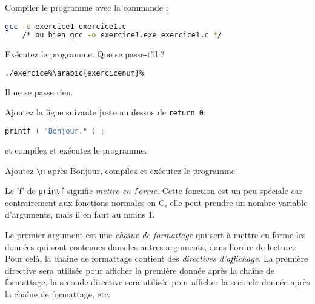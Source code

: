 \question Compiler le programme avec la commande :
\begin{solutioncachee}
  \begin{lstlisting}[language=bash]
    gcc -o exercice1 exercice1.c
    /* ou bien gcc -o exercice1.exe exercice1.c */
  \end{lstlisting}
\end{solutioncachee}

\question Exécutez le programme. Que se passe-t'il ?
\begin{solutioncachee}
  \begin{lstlisting}[language=bash]
    ./exercice%\arabic{exercicenum}%
  \end{lstlisting}
  Il ne se passe rien.
\end{solutioncachee}

\question Ajoutez la ligne suivante juste au dessus de \texttt{return 0}:
\begin{lstlisting}[language=C]
  printf ( "Bonjour." ) ;
\end{lstlisting}
et compilez et exécutez le programme.

\begin{center}
\end{center}

\question Ajoutez \verb+\n+ après Bonjour, compilez et exécutez le programme.

\begin{center}
\end{center}


Le 'f' de \texttt{printf} signifie \emph{mettre en
  \texttt{f}orme}. Cette fonction est un peu spéciale car
contrairement aux fonctions normales en C, elle peut prendre un nombre
variable d'arguments, mais il en faut au moins 1. 

Le premier argument est une \emph{chaîne de formattage} qui sert à
mettre en forme les données qui sont contenues dans les autres
arguments, dans l'ordre de lecture. Pour celà, la chaîne de formattage
contient des \emph{directives d'affichage}. La première directive sera
utilisée pour afficher la première donnée après la chaîne de
formattage, la seconde directive sera utilisée pour afficher la
seconde donnée après la chaîne de formattage, etc.

